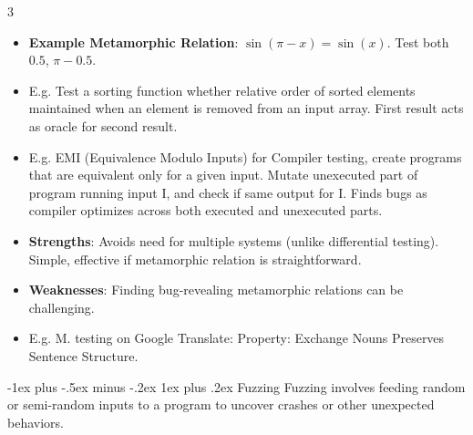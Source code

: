 \documentclass[a4paper, 10pt, landscape]{article}
\makeatletter
\renewcommand{\subsubsection}{\@startsection{subsubsection}{3}{0mm}%
                                {-1ex plus -.5ex minus -.2ex}%
                                {1ex plus .2ex}%
                                {\normalfont\small\bfseries}}
\makeatother
\begin{document}
\begin{multicols*}{3}
\begin{itemize}
\item \textbf{Example Metamorphic Relation}: $ \sin(\pi - x) = \sin(x) $. Test both $0.5$, $\pi - 0.5$.
\item E.g.  Test a sorting function whether relative order of sorted elements maintained when an element is removed from an input array. First result acts as oracle for second result.
\item E.g. EMI (Equivalence Modulo Inputs) for Compiler testing, create programs that are equivalent only for a given input. Mutate unexecuted part of program running input I, and check if same output for I. Finds bugs as compiler optimizes across both executed and unexecuted parts.
\item \textbf{Strengths}: Avoids need for multiple systems (unlike differential testing). Simple, effective if metamorphic relation is straightforward.
\item  \textbf{Weaknesses}: Finding bug-revealing metamorphic relations can be challenging.
\item E.g. M. testing on Google Translate: Property: Exchange Nouns Preserves Sentence Structure.
\end{itemize}
 

\subsubsection{Fuzzing}
Fuzzing involves feeding random or semi-random inputs to a program to uncover crashes or other unexpected behaviors.


\end{multicols*}
\end{document}
